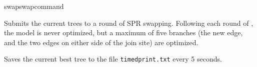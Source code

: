 \begin{command}{swap}{swapcommand}
\begin{poyexamples}
{Submits the current trees to a round of SPR swapping. Following each round of 
, the model is never optimized, but a maximum of five branches 
(the new edge, and the two edges on either side of the join site) are optimized.}

{Saves the current best tree to the file \texttt{timedprint.txt} every 5 seconds.}

\end{poyexamples}

\begin{poyalso}
\end{poyalso} 

\end{command}


